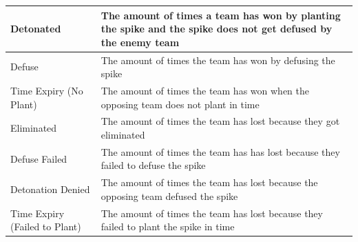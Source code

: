 \begin{longtable}{|>{\raggedright\arraybackslash}p{3cm}|p{12cm}|}
\hline
Detonated & The amount of times a team has won by planting the spike and the spike does not get defused by the enemy team \\
\hline
Defuse & The amount of times the team has won by defusing the spike \\
\hline
Time Expiry (No Plant) & The amount of times the team has won when the opposing team does not plant in time \\
\hline
Eliminated & The amount of times the team has lost because they got eliminated \\
\hline
Defuse Failed & The amount of times the team has has lost because they failed to defuse the spike \\
\hline
Detonation Denied & The amount of times the team has lost because the opposing team defused the spike \\
\hline
Time Expiry (Failed to Plant) & The amount of times the team has lost because they failed to plant the spike in time \\
\hline
\end{longtable}

